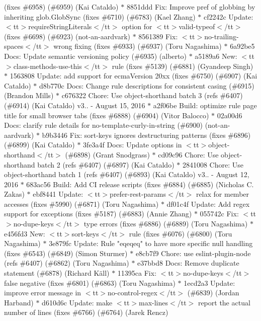 \begin{DoxyItemize}
(fixes \#6958) (\#6959) (\+Kai Cataldo) \texorpdfstring{$\ast$}{*} 8851ddd Fix\+: Improve pref of globbing by inheriting glob.\+Glob\+Sync (fixes \#6710) (\#6783) (\+Kael Zhang) \texorpdfstring{$\ast$}{*} cf2242c Update\+: $<$tt$>$require\+String\+Literals$<$/tt$>$ option for $<$tt$>$valid-\/typeof$<$/tt$>$ (fixes \#6698) (\#6923) (not-\/an-\/aardvark) \texorpdfstring{$\ast$}{*} 8561389 Fix\+: $<$tt$>$no-\/trailing-\/spaces$<$/tt$>$ wrong fixing (fixes \#6933) (\#6937) (\+Toru Nagashima) \texorpdfstring{$\ast$}{*} 6a92be5 Docs\+: Update semantic versioning policy (\#6935) (alberto) \texorpdfstring{$\ast$}{*} a5189a6 New\+: $<$tt$>$class-\/methods-\/use-\/this$<$/tt$>$ rule (fixes \#5139) (\#6881) (\+Gyandeep Singh) \texorpdfstring{$\ast$}{*} 1563808 Update\+: add support for ecma\+Version 20xx (fixes \#6750) (\#6907) (\+Kai Cataldo) \texorpdfstring{$\ast$}{*} d8b770c Docs\+: Change rule descriptions for consistent casing (\#6915) (\+Brandon Mills) \texorpdfstring{$\ast$}{*} c676322 Chore\+: Use object-\/shorthand batch 3 (refs \#6407) (\#6914) (\+Kai Cataldo)  v3.. -\/ August 15, 2016  \texorpdfstring{$\ast$}{*} a2f06be Build\+: optimize rule page title for small browser tabs (fixes \#6888) (\#6904) (\+Vitor Balocco) \texorpdfstring{$\ast$}{*} 02a00d6 Docs\+: clarify rule details for no-\/template-\/curly-\/in-\/string (\#6900) (not-\/an-\/aardvark) \texorpdfstring{$\ast$}{*} b9b3446 Fix\+: sort-\/keys ignores destructuring patterns (fixes \#6896) (\#6899) (\+Kai Cataldo) \texorpdfstring{$\ast$}{*} 3fe3a4f Docs\+: Update options in $<$tt$>$object-\/shorthand$<$/tt$>$ (\#6898) (\+Grant Snodgrass) \texorpdfstring{$\ast$}{*} cd09c96 Chore\+: Use object-\/shorthand batch 2 (refs \#6407) (\#6897) (\+Kai Cataldo) \texorpdfstring{$\ast$}{*} 2841008 Chore\+: Use object-\/shorthand batch 1 (refs \#6407) (\#6893) (\+Kai Cataldo)  v3.. -\/ August 12, 2016  \texorpdfstring{$\ast$}{*} 683ac56 Build\+: Add CI release scripts (fixes \#6884) (\#6885) (\+Nicholas C. Zakas) \texorpdfstring{$\ast$}{*} ebf8441 Update\+: $<$tt$>$prefer-\/rest-\/params$<$/tt$>$ relax for member accesses (fixes \#5990) (\#6871) (\+Toru Nagashima) \texorpdfstring{$\ast$}{*} df01c4f Update\+: Add regex support for exceptions (fixes \#5187) (\#6883) (\+Annie Zhang) \texorpdfstring{$\ast$}{*} 055742c Fix\+: $<$tt$>$no-\/dupe-\/keys$<$/tt$>$ type errors (fixes \#6886) (\#6889) (\+Toru Nagashima) \texorpdfstring{$\ast$}{*} e456fd3 New\+: $<$tt$>$sort-\/keys$<$/tt$>$ rule (fixes \#6076) (\#6800) (\+Toru Nagashima) \texorpdfstring{$\ast$}{*} 3e879fc Update\+: Rule "{}eqeqeq"{} to have more specific null handling (fixes \#6543) (\#6849) (\+Simon Sturmer) \texorpdfstring{$\ast$}{*} e8cb7f9 Chore\+: use eslint-\/plugin-\/node (refs \#6407) (\#6862) (\+Toru Nagashima) \texorpdfstring{$\ast$}{*} e37bbd8 Docs\+: Remove duplicate statement (\#6878) (\+Richard Käll) \texorpdfstring{$\ast$}{*} 11395ca Fix\+: $<$tt$>$no-\/dupe-\/keys$<$/tt$>$ false negative (fixes \#6801) (\#6863) (\+Toru Nagashima) \texorpdfstring{$\ast$}{*} 1ecd2a3 Update\+: improve error message in $<$tt$>$no-\/control-\/regex$<$/tt$>$ (\#6839) (\+Jordan Harband) \texorpdfstring{$\ast$}{*} d610d6c Update\+: make $<$tt$>$max-\/lines$<$/tt$>$ report the actual number of lines (fixes \#6766) (\#6764) (\+Jarek Rencz) 
\end{DoxyItemize}
